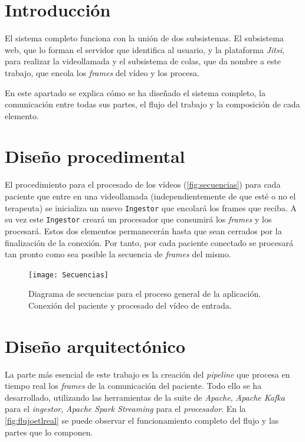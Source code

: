 
\section{Introducción}

El sistema completo funciona con la unión de dos subsistemas. El subsistema web, que lo forman el servidor que identifica al usuario, y la plataforma \textit{Jitsi}, para realizar la videollamada y el subsistema de colas, que da nombre a este trabajo, que encola los \textit{frames} del vídeo y los procesa. 

En este apartado se explica cómo se ha diseñado el sistema completo, la comunicación entre todas sus partes, el flujo del trabajo y la composición de cada elemento.

\section{Diseño procedimental}

El procedimiento para el procesado de los vídeos (\autoref{fig:secuencias}) para cada paciente que entre en una videollamada (independientemente de que esté o no el terapeuta) se inicializa un nuevo \texttt{Ingestor} que encolará los frames que reciba. A su vez este \texttt{Ingestor} creará un procesador que consumirá los \textit{frames} y los procesará. Estos dos elementos permanecerán hasta que sean cerrados por la finalización de la conexión. Por tanto, por cada paciente conectado se procesará tan pronto como sea posible la secuencia de \textit{frames} del mismo.

\begin{figure}
	\centering
	\texttt{[image: Secuencias]}
	\caption[Diagrama de secuencia para el proceso general de la aplicación.]{Diagrama de secuencias para el proceso general de la aplicación. Conexión del paciente y procesado del vídeo de entrada.}
	\label{fig:secuencias}
\end{figure}



\section{Diseño arquitectónico}

La parte más esencial de este trabajo es la creación del \textit{pipeline} que procesa en tiempo real los \textit{frames} de la comunicación del paciente. Todo ello se ha desarrollado, utilizando las herramientas de la suite de \textit{Apache}, \textit{Apache Kafka} para el \textit{ingestor}, \textit{Apache Spark Streaming} para el \textit{procesador}. En la \autoref{fig:flujoetlreal} se puede observar el funcionamiento completo del flujo y las partes que lo componen.

